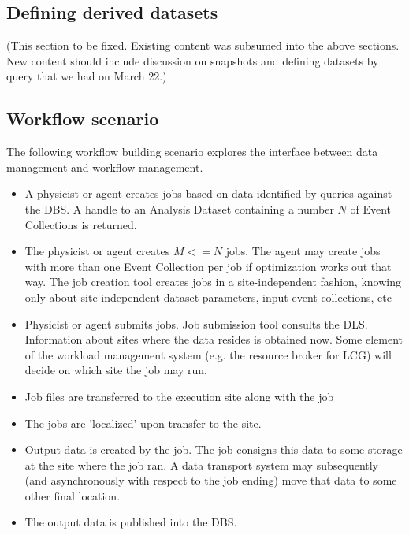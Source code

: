 \documentclass{cmspaper}
\begin{document}
\subsection{Defining derived datasets}

(This section to be fixed. Existing content was subsumed into the above sections.  
New content should include discussion on snapshots and defining datasets by 
query that we had on March 22.) 

 
\subsection{Workflow scenario}

The following workflow building scenario explores the 
interface between data management and workflow management.
\begin{itemize}
\item A physicist or agent creates jobs based on data identified by queries against 
the DBS.  A handle to an Analysis Dataset containing a number $N$ of
Event Collections is returned.  
\item The physicist or agent creates $M <= N$ jobs.  The agent may create jobs with more than 
one Event Collection per job if optimization works out that way.  The job 
creation tool creates jobs in a site-independent fashion, knowing only about 
site-independent dataset parameters, input event collections, etc 
\item Physicist or agent submits jobs. Job submission tool consults the DLS. 
Information about sites where the data resides is obtained now. Some element
of the workload management system (e.g. the resource broker for LCG) will
decide on which site the job may run.

\item Job files are transferred to the execution site along with the job 
\item The jobs are 'localized' upon transfer to the site. 
\item Output data is created by the job. The job consigns this data to
some storage at the site where the job ran. A data transport system may
subsequently (and asynchronously with respect to the job ending) move that 
data to some other final location.
\item The output data is published into the DBS.
\end{itemize}
\end{document}
